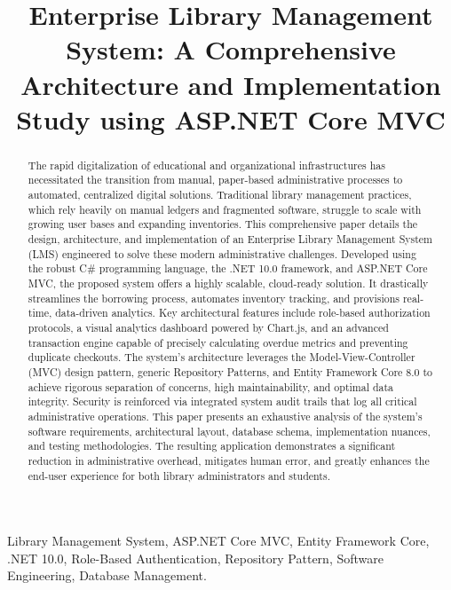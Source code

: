 \documentclass[conference]{IEEEtran}
\begin{document}
\title{Enterprise Library Management System: A Comprehensive Architecture and Implementation Study using ASP.NET Core MVC\\
}

\author{
}

\maketitle

\begin{abstract}
The rapid digitalization of educational and organizational infrastructures has necessitated the transition from manual, paper-based administrative processes to automated, centralized digital solutions. Traditional library management practices, which rely heavily on manual ledgers and fragmented software, struggle to scale with growing user bases and expanding inventories. This comprehensive paper details the design, architecture, and implementation of an Enterprise Library Management System (LMS) engineered to solve these modern administrative challenges. Developed using the robust C\# programming language, the .NET 10.0 framework, and ASP.NET Core MVC, the proposed system offers a highly scalable, cloud-ready solution. It drastically streamlines the borrowing process, automates inventory tracking, and provisions real-time, data-driven analytics. Key architectural features include role-based authorization protocols, a visual analytics dashboard powered by Chart.js, and an advanced transaction engine capable of precisely calculating overdue metrics and preventing duplicate checkouts. The system's architecture leverages the Model-View-Controller (MVC) design pattern, generic Repository Patterns, and Entity Framework Core 8.0 to achieve rigorous separation of concerns, high maintainability, and optimal data integrity. Security is reinforced via integrated system audit trails that log all critical administrative operations. This paper presents an exhaustive analysis of the system's software requirements, architectural layout, database schema, implementation nuances, and testing methodologies. The resulting application demonstrates a significant reduction in administrative overhead, mitigates human error, and greatly enhances the end-user experience for both library administrators and students.
\end{abstract}

\begin{IEEEkeywords}
Library Management System, ASP.NET Core MVC, Entity Framework Core, .NET 10.0, Role-Based Authentication, Repository Pattern, Software Engineering, Database Management.
\end{IEEEkeywords}
\end{document}
